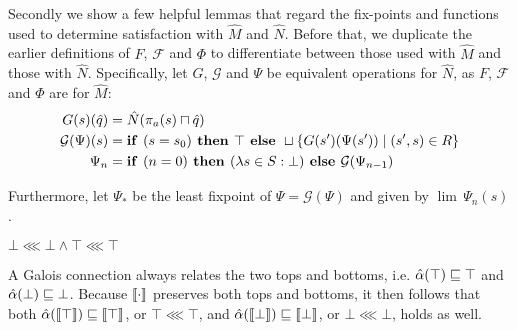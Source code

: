 Secondly we show a few helpful lemmas that regard the fix-points and functions used to determine satisfaction with $\hat M$ and $\hat N$. Before that, we duplicate the earlier definitions of $F$, $\mathcal{F}$ and $\Phi$ to differentiate between those used with $\hat M$ and those with $\hat N$. Specifically, let $G$, $\mathcal{G}$ and $\Psi$ be equivalent operations for $\hat N$, as $F$, $\mathcal{F}$ and $\Phi$ are for $\hat M$:
%
\begin{align*}
G(s)(\hat q) &= \hat N(\pi_{a}(s) \sqcap \hat q) \\
\mathcal{G}(\Psi)(s) &= \textrm{\textbf{if }} (s = s_{0}) \textrm{\textbf{ then }} \top \textrm{\textbf{ else }} \sqcup \{ G(s')(\Psi(s')) \mid (s',s) \in R \} \\
\Psi_{n} &= \textrm{\textbf{if }} (n = 0) \textrm{\textbf{ then }} (\lambda s \in S : \bot) \textrm{\textbf{ else }} \mathcal{G}(\Psi_{n-1}) \\
\end{align*}

\noindent Furthermore, let $\Psi_{*}$ be the least fixpoint of $\Psi = \mathcal{G}(\Psi)$ and given by $\lim \, \Psi_{n}(s)$.

\begin{lemma} \label{lem:bot-refine-bot}
$\bot \lll \bot \wedge \top \lll \top$
\end{lemma}

A Galois connection always relates the two tops and bottoms, i.e. $\hat{\alpha}(\top) \sqsubseteq \top$ and $\hat{\alpha}(\bot) \sqsubseteq \bot$. Because $\llbracket \cdot \rrbracket$ preserves both tops and bottoms, it then follows that both $\hat{\alpha}(\llbracket \top \rrbracket) \sqsubseteq \llbracket \top \rrbracket$, or $\top \lll \top$, and $\hat{\alpha}(\llbracket \bot \rrbracket) \sqsubseteq \llbracket \bot \rrbracket$, or $\bot \lll \bot$, holds as well.



